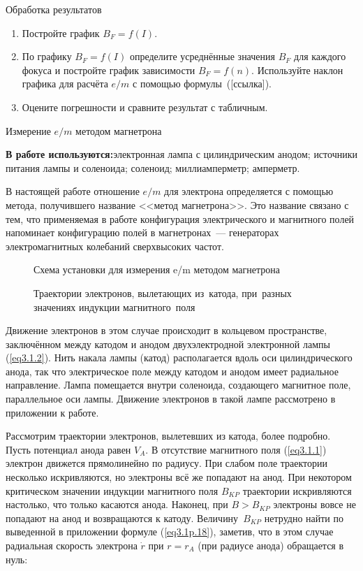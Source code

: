 {\rm Обработка результатов}

\begin{enumerate}
\item{Постройте график $B_F=f(I)$.}
\item{По графику $B_F=f(I)$ определите усреднённые значения $B_F$ для каждого фокуса и постройте график зависимости $B_F=f(n)$. Используйте наклон графика для расчёта $e/m$ с помощью формулы~([ссылка]).}
\item{Оцените погрешности и сравните результат с табличным.}

\end{enumerate}


{\Large Измерение ${e/m}$ методом магнетрона}

{\bf В работе используются:}{электронная лампа с цилиндрическим анодом; источники питания лампы и соленоида; соленоид; миллиамперметр; амперметр.}

В настоящей работе отношение $e/m$ для электрона определяется с помощью метода, получившего название <<метод
магнетрона>>. Это название связано с тем, что применяемая в работе конфигурация электрического и магнитного полей
напоминает конфигурацию полей в магнетронах~--- генераторах электромагнитных колебаний сверхвысоких частот.

\begin{figure}
\caption{Схема установки для измерения e/m методом магнетрона}
\label{fig3.1.2}
\end{figure}

\begin{figure}
\caption{Траектории электронов, вылетающих из~катода, при~разных значениях индукции магнитного~поля}
\label{fig3.1.3}
\end{figure}

Движение электронов в этом случае происходит в кольцевом пространстве, заключённом между катодом и анодом
двухэлектродной электронной лампы (\ref{eq3.1.2}). Нить накала лампы (катод) располагается вдоль оси цилиндрического анода, так что электрическое поле между катодом и анодом имеет радиальное направление. Лампа помещается внутри соленоида, создающего магнитное поле, параллельное оси лампы. Движение электронов в такой лампе рассмотрено в приложении к работе.

Рассмотрим траектории электронов, вылетевших из катода, более подробно. Пусть потенциал анода равен $V_A$. В отсутствие магнитного поля (\ref{eq3.1.1}) электрон движется прямолинейно по радиусу. При слабом поле траектории несколько искривляются, но электроны всё же попадают на анод. При некотором критическом значении индукции магнитного поля $B_{KP}$ траектории искривляются настолько, что только касаются анода. Наконец, при $B>B_{KP}$ электроны вовсе не попадают на анод и возвращаются к катоду. Величину~$B_{KP}$ нетрудно найти по выведенной в приложении формуле (\ref{eq3.1p.18}), заметив, что в этом случае радиальная скорость электрона $\dot{r}$ при $r=r_A$ (при радиусе анода) обращается в нуль:

